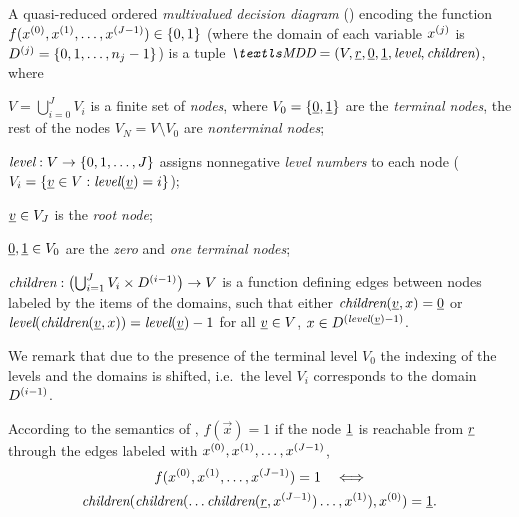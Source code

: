 \begin{dfn}
  A quasi-reduced ordered \emph{multivalued decision diagram}
  () encoding the function
  $f(x^{(0)}, x^{(1)}, \ldots, x^{(J - 1)}) \in \{0, 1\}$
  (where the domain of each variable $x^{(j)}$ is
  $D^{(j)} = \{0, 1, \ldots, n_j - 1\}$) is a tuple
  $\MDD = (V, \ddnode{r}, \ddnode{0}, \ddnode{1}, \mddLevel,
  \mddChildren)$, where
  \begin{asparaitem}
  \item $V = \bigcup_{i = 0}^{J} V_i$ is a finite set of \emph{nodes},
    where $V_0 = \{ \underline{0}, \underline{1} \}$ are the \emph{terminal
      nodes}, the rest of the nodes $V_N = V \setminus V_0$ are
    \emph{nonterminal nodes};
  \item $\textit{level} : V \to \{0, 1, \ldots, J\}$ assigns nonnegative
    \emph{level numbers} to each node
    ($V_i = \{\underline{v} \in V : \textit{level}(\underline{v}) = i \}$);
  \item $\underline{v} \in V_J$ is the \emph{root node};
  \item $\underline{0}, \underline{1} \in V_0$ are the \emph{zero} and
    \emph{one terminal nodes};
  \item $\textit{children}: \bigl( \bigcup_{i = 1}^J V_i \times D^{(i
      - 1)} \bigr) \to V$
    is a function defining edges between nodes labeled by the items of
    the domains, such that either
    $\textit{children}(\underline{v}, x) = \underline{0}$ or
    $\textit{level}(\textit{children}(\underline{v}, x)) = \textit{level}(\underline{v}) - 1$ for
    all $\underline{v} \in V$, $x \in D^{(\textit{level}(\underline{v}) - 1)}$.
  \end{asparaitem}
\end{dfn}

We remark that due to the presence of the terminal level $V_0$ the
indexing of the levels and the domains is shifted, i.e.~the level
$V_i$ corresponds to the domain $D^{(i - 1)}$.

According to the semantics of , $f(\vec{x}) = 1$ if the
node $\underline{1}$ is reachable from $\underline{r}$ through the edges
labeled with $x^{(0)}, x^{(1)}, \ldots, x^{(J - 1)}$,
\begin{multline}
  f(x^{(0)}, x^{(1)}, \ldots, x^{(J - 1)}) = 1
  \quad\Longleftrightarrow\\
  \textit{children}(\textit{children}(\ldots \textit{children}(\underline{r}, x^{(J
    - 1)}) \ldots, x^{(1)}), x^{(0)}) = \underline{1} \text.
\end{multline}

